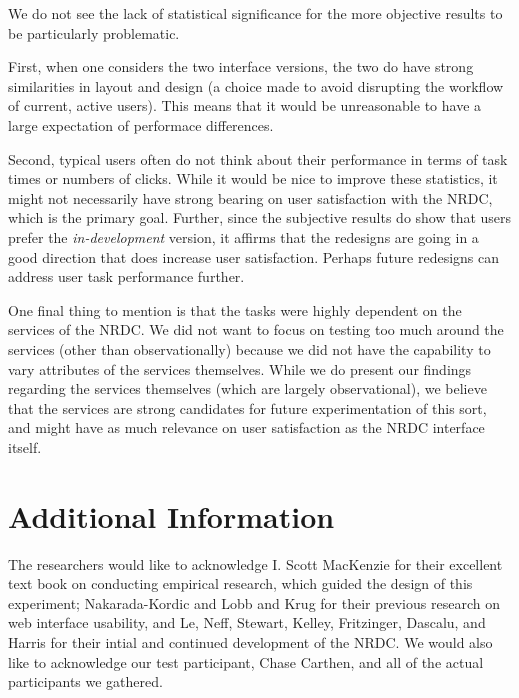 \documentclass{article}
\begin{document}
We do not see the lack of statistical significance for the more objective results to be particularly problematic.

First, when one considers the two interface versions, the two do have strong similarities in layout and design (a choice made to avoid disrupting the workflow of current, active users). This means that it would be unreasonable to have a large expectation of performace differences.

Second, typical users often do not think about their performance in terms of task times or numbers of clicks. While it would be nice to improve these statistics, it might not necessarily have strong bearing on user satisfaction with the NRDC, which is the primary goal. Further, since the subjective results do show that users prefer the \emph{in-development} version, it affirms that the redesigns are going in a good direction that does increase user satisfaction. Perhaps future redesigns can address user task performance further.

One final thing to mention is that the tasks were highly dependent on the services of the NRDC. We did not want to focus on testing too much around the services (other than observationally) because we did not have the capability to vary attributes of the services themselves. While we do present our findings regarding the services themselves (which are largely observational), we believe that the services are strong candidates for future experimentation of this sort, and might have as much relevance on user satisfaction as the NRDC interface itself.

%
%
\section{Additional Information}
The researchers would like to acknowledge I. Scott MacKenzie\cite{hci-research-perspective} for their excellent text book on conducting empirical research, which guided the design of this experiment; Nakarada-Kordic and Lobb\cite{PerceivedAttractiveness} and Krug\cite{dontmakemethink} for their previous research on web interface usability, and Le, Neff, Stewart, Kelley, Fritzinger, Dascalu, and Harris\cite{microservice-nrdc} for their intial and continued development of the NRDC. We would also like to acknowledge our test participant, Chase Carthen, and all of the actual participants we gathered.

%
%
\end{document}
